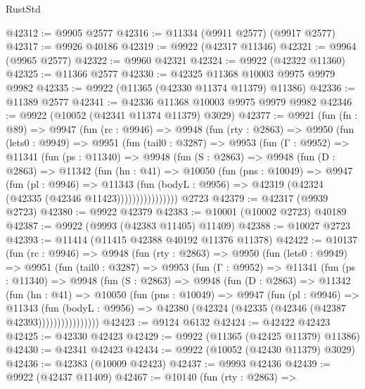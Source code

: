 \begin{lexlean}{RustStd}
\begin{coremodule}
@42312 := @9905 @2577
@42316 := @11334 (@9911 @2577) (@9917 @2577)
@42317 := @9926 @40186
@42319 := @9922 (@42317 @11346)
@42321 := @9964 (@9965 @2577)
@42322 := @9960 @42321
@42324 := @9922 (@42322 @11360)
@42325 := @11366 @2577
@42330 := @42325 @11368 @10003 @9975 @9979 @9982
@42335 := @9922 (@11365 (@42330 @11374 @11379) @11386)
@42336 := @11389 @2577
@42341 := @42336 @11368 @10003 @9975 @9979 @9982
@42346 := @9922 (@10052 (@42341 @11374 @11379) @3029)
@42377 := @9921
    (fun (fn : @89) =>
    @9947
      (fun (rc : @9946) =>
      @9948
        (fun (rty : @2863) =>
        @9950
          (fun (lets0 : @9949) =>
          @9951
            (fun (tail0 : @3287) =>
            @9953
              (fun (Γ : @9952) =>
              @11341
                (fun (ps : @11340) =>
                @9948
                  (fun (S : @2863) =>
                  @9948
                    (fun (D : @2863) =>
                    @11342
                      (fun (hn : @41) =>
                      @10050
                        (fun (pns : @10049) =>
                        @9947
                          (fun (pl : @9946) =>
                          @11343
                            (fun (bodyL : @9956) =>
                            @42319 (@42324 (@42335 (@42346 @11423))))))))))))))))
    @2723
@42379 := @42317 (@9939 @2723)
@42380 := @9922 @42379
@42383 := @10001 (@10002 @2723) @40189
@42387 := @9922 (@9993 (@42383 @11405) @11409)
@42388 := @10027 @2723
@42393 := @11414 (@11415 @42388 @40192 @11376 @11378)
@42422 := @10137
    (fun (rc : @9946) =>
    @9948
      (fun (rty : @2863) =>
      @9950
        (fun (lets0 : @9949) =>
        @9951
          (fun (tail0 : @3287) =>
          @9953
            (fun (Γ : @9952) =>
            @11341
              (fun (ps : @11340) =>
              @9948
                (fun (S : @2863) =>
                @9948
                  (fun (D : @2863) =>
                  @11342
                    (fun (hn : @41) =>
                    @10050
                      (fun (pns : @10049) =>
                      @9947
                        (fun (pl : @9946) =>
                        @11343
                          (fun (bodyL : @9956) =>
                          @42380 (@42324 (@42335 (@42346 (@42387 @42393))))))))))))))))
@42423 := @9124 @6132
@42424 := @42422 @42423
@42425 := @42330 @42423
@42429 := @9922 (@11365 (@42425 @11379) @11386)
@42430 := @42341 @42423
@42434 := @9922 (@10052 (@42430 @11379) @3029)
@42436 := @42383 (@10009 @42423)
@42437 := @9993 @42436
@42439 := @9922 (@42437 @11409)
@42467 := @10140
    (fun (rty : @2863) =>

\end{coremodule}
\end{lexlean}
